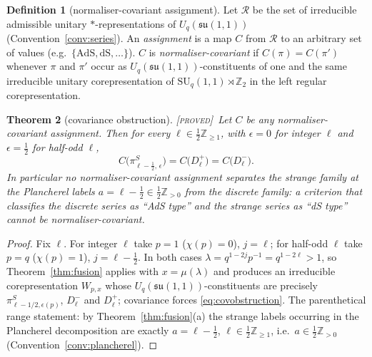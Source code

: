 \documentclass[11pt,a4paper]{article}
\newcommand{\PROVED}{{\color{ForestGreen}\textsc{[proved]}}}
\theoremstyle{definition}
\newtheorem{definition}{Definition}[section]
\theoremstyle{plain}
\newtheorem{theorem}[definition]{Theorem}
\newcommand{\Uq}{U_q(\mathfrak{su}(1,1))}
\newcommand{\SUq}{\mathrm{SU}_q(1,1)}
\newcommand{\Z}{\mathbb{Z}}
\begin{document}
\begin{definition}[normaliser-covariant assignment]\label{def:covariant}
Let $\mathcal{R}$ be the set of irreducible admissible unitary $*$-representations of $\Uq$
(Convention~\ref{conv:series}). An \emph{assignment} is a map $C$ from $\mathcal{R}$ to an
arbitrary set of values (e.g.\ $\{\mathrm{AdS},\mathrm{dS},\ldots\}$). $C$ is
\emph{normaliser-covariant} if $C(\pi)=C(\pi')$ whenever $\pi$ and $\pi'$ occur as
$\Uq$-constituents of one and the same irreducible unitary corepresentation of
$\SUq\rtimes\Z_2$ in the left regular corepresentation.
\end{definition}

\begin{theorem}[covariance obstruction]\label{thm:covobstruction}
\PROVED\ Let $C$ be any normaliser-covariant assignment. Then for every
$\ell\in\tfrac12\Z_{\ge1}$, with $\epsilon=0$ for integer $\ell$ and $\epsilon=\tfrac12$ for
half-odd $\ell$,
\begin{equation}\label{eq:covobstruction}
  C\bigl(\pi^{S}_{\ell-\frac12,\,\epsilon}\bigr)=C\bigl(D^{+}_{\ell}\bigr)
  =C\bigl(D^{-}_{\ell}\bigr).
\end{equation}
In particular no normaliser-covariant assignment separates the strange family at the
Plancherel labels $a=\ell-\tfrac12\in\tfrac12\Z_{>0}$ from the discrete family: a criterion
that classifies the discrete series as ``AdS type'' and the strange series as ``dS type''
cannot be normaliser-covariant.
\end{theorem}

\begin{proof}
Fix $\ell$. For integer $\ell$ take $p=1$ ($\chi(p)=0$), $j=\ell$; for half-odd $\ell$ take
$p=q$ ($\chi(p)=1$), $j=\ell-\tfrac12$. In both cases $\lambda=q^{1-2j}p^{-1}=q^{1-2\ell}>1$,
so Theorem~\ref{thm:fusion} applies with $x=\mu(\lambda)$ and produces an irreducible
corepresentation $W_{p,x}$ whose $\Uq$-constituents are precisely
$\pi^{S}_{\ell-1/2,\epsilon(p)}$, $D^{-}_{\ell}$ and $D^{+}_{\ell}$; covariance forces
\eqref{eq:covobstruction}. The parenthetical range statement: by
Theorem~\ref{thm:fusion}(a) the strange labels occurring in the Plancherel decomposition are
exactly $a=\ell-\tfrac12$, $\ell\in\tfrac12\Z_{\ge1}$, i.e.\ $a\in\tfrac12\Z_{>0}$
(Convention~\ref{conv:plancherel}).
\end{proof}
\end{document}
